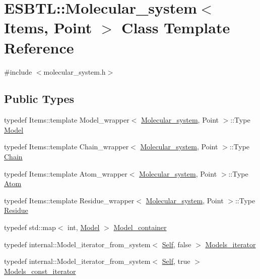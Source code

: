 \hypertarget{classESBTL_1_1Molecular__system}{}\section{E\+S\+B\+TL\+:\+:Molecular\+\_\+system$<$ Items, Point $>$ Class Template Reference}
\label{classESBTL_1_1Molecular__system}


{\ttfamily \#include $<$molecular\+\_\+system.\+h$>$}

\subsection*{Public Types}
\begin{DoxyCompactItemize}
\item 
typedef Items\+::template Model\+\_\+wrapper$<$ \hyperlink{classESBTL_1_1Molecular__system}{Molecular\+\_\+system}, Point $>$\+::Type \hyperlink{classESBTL_1_1Molecular__system_ac99c9f22457fd0498324fb5cfc276227}{Model}
\item 
typedef Items\+::template Chain\+\_\+wrapper$<$ \hyperlink{classESBTL_1_1Molecular__system}{Molecular\+\_\+system}, Point $>$\+::Type \hyperlink{classESBTL_1_1Molecular__system_a7d3b3623db6fbe82b1f4a73138894617}{Chain}
\item 
typedef Items\+::template Atom\+\_\+wrapper$<$ \hyperlink{classESBTL_1_1Molecular__system}{Molecular\+\_\+system}, Point $>$\+::Type \hyperlink{classESBTL_1_1Molecular__system_aae37491a328fde3bc58171d68c998c7c}{Atom}
\item 
typedef Items\+::template Residue\+\_\+wrapper$<$ \hyperlink{classESBTL_1_1Molecular__system}{Molecular\+\_\+system}, Point $>$\+::Type \hyperlink{classESBTL_1_1Molecular__system_a87f7fdfbb412bff03287ed8d1416b392}{Residue}
\item 
typedef std\+::map$<$ int, \hyperlink{classESBTL_1_1Molecular__system_ac99c9f22457fd0498324fb5cfc276227}{Model} $>$ \hyperlink{classESBTL_1_1Molecular__system_a02d244045c99d943365db30208c8321d}{Model\+\_\+container}
\item 
typedef internal\+::\+Model\+\_\+iterator\+\_\+from\+\_\+system$<$ \hyperlink{classESBTL_1_1Molecular__system}{Self}, false $>$ \hyperlink{group__grp__iters_ga752760df14baf1b92dac469d712202bc}{Models\+\_\+iterator}
\item 
typedef internal\+::\+Model\+\_\+iterator\+\_\+from\+\_\+system$<$ \hyperlink{classESBTL_1_1Molecular__system}{Self}, true $>$ \hyperlink{group__grp__iters_ga6383c53b86af7a7a7376bce06e4febb8}{Models\+\_\+const\+\_\+iterator}
\end{DoxyCompactItemize}
